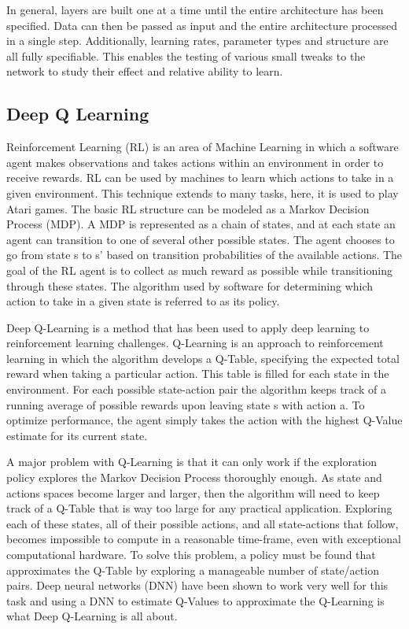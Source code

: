 \documentclass{article}
\begin{document}
In general, layers are built one at a time until the entire architecture has been specified. Data can then be passed as input and the entire architecture processed in a single step. Additionally, learning rates, parameter types and structure are all fully specifiable. This enables the testing of various small tweaks to the network to study their effect and relative ability to learn.

\subsection{Deep Q Learning}
Reinforcement Learning (RL) is an area of Machine Learning in which a software agent makes observations and takes actions within an environment in order to receive rewards. RL can be used by machines to learn which actions to take in a given environment. This technique extends to many tasks, here, it is used to play Atari games. The basic RL structure can be modeled as a Markov Decision Process (MDP). A MDP is represented as a chain of states, and at each state an agent can transition to one of several other possible states. The agent chooses to go from state s to s' based on transition probabilities of the available actions. The goal of the RL agent is to collect as much reward as possible while transitioning through these states. The algorithm used by software for determining which action to take in a given state is referred to as its policy. \par
Deep Q-Learning is a method that has been used to apply deep learning to reinforcement learning challenges. Q-Learning is an approach to reinforcement learning in which the algorithm develops a Q-Table, specifying the expected total reward when taking a particular action. This table is filled for each state in the environment. For each possible state-action pair the algorithm keeps track of a running average of possible rewards upon leaving state s with action a. To optimize performance, the agent simply takes the action with the highest Q-Value estimate for its current state. \par
A major problem with Q-Learning is that it can only work if the exploration policy explores the Markov Decision Process thoroughly enough. As state and actions spaces become larger and larger, then the algorithm will need to keep track of a Q-Table that is way too large for any practical application. Exploring each of these states, all of their possible actions, and all state-actions that follow, becomes impossible to compute in a reasonable time-frame, even with exceptional computational hardware. To solve this problem, a policy must be found that approximates the Q-Table by exploring a manageable number of state/action pairs. Deep neural networks (DNN) have been shown to work very well for this task and using a  DNN to estimate Q-Values to approximate the Q-Learning is what Deep Q-Learning is all about.  \par
\end{document}
